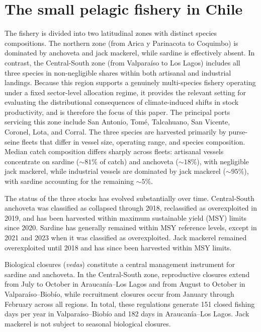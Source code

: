 \documentclass[
  11pt,
]{article}
\begin{document}
\section{The small pelagic fishery in Chile}\label{the-small-pelagic-fishery-in-chile}

The fishery is divided into two latitudinal zones with distinct species compositions. The northern zone (from Arica y Parinacota to Coquimbo) is dominated by anchoveta and jack mackerel, while sardine is effectively absent. In contrast, the Central-South zone (from Valparaíso to Los Lagos) includes all three species in non-negligible shares within both artisanal and industrial landings. Because this region supports a genuinely multi-species fishery operating under a fixed sector-level allocation regime, it provides the relevant setting for evaluating the distributional consequences of climate-induced shifts in stock productivity, and is therefore the focus of this paper. The principal ports servicing this zone include San Antonio, Tomé, Talcahuano, San Vicente, Coronel, Lota, and Corral. The three species are harvested primarily by purse-seine fleets that differ in vessel size, operating range, and species composition. Median catch composition differs sharply across fleets: artisanal vessels concentrate on sardine (\(\sim 81\%\) of catch) and anchoveta (\(\sim 18\%\)), with negligible jack mackerel, while industrial vessels are dominated by jack mackerel (\(\sim 95\%\)), with sardine accounting for the remaining \(\sim 5\%\).

The status of the three stocks has evolved substantially over time. Central-South anchoveta was classified as collapsed through 2018, reclassified as overexploited in 2019, and has been harvested within maximum sustainable yield (MSY) limits since 2020. Sardine has generally remained within MSY reference levels, except in 2021 and 2023 when it was classified as overexploited. Jack mackerel remained overexploited until 2018 and has since been harvested within MSY limits.

Biological closures (\emph{vedas}) constitute a central management instrument for sardine and anchoveta. In the Central-South zone, reproductive closures extend from July to October in Araucanía--Los Lagos and from August to October in Valparaíso--Biobío, while recruitment closures occur from January through February across all regions. In total, these regulations generate 151 closed fishing days per year in Valparaíso--Biobío and 182 days in Araucanía--Los Lagos. Jack mackerel is not subject to seasonal biological closures.
\end{document}
